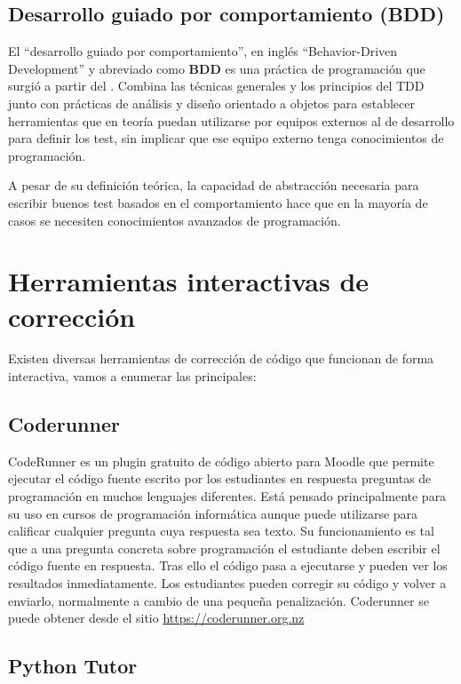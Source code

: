\subsection {Desarrollo guiado por comportamiento (BDD)}

El ``desarrollo guiado por comportamiento'', en inglés ``Behavior-Driven Development'' y abreviado como \textbf{BDD} es una práctica de programación que surgió a partir del . Combina las técnicas generales y los principios del TDD junto con prácticas de análisis y diseño orientado a objetos para establecer herramientas que en teoría puedan utilizarse por equipos externos al de desarrollo para definir los test, sin implicar que ese equipo externo tenga conocimientos de programación.

\bigskip
A pesar de su definición teórica, la capacidad de abstracción necesaria para escribir buenos test basados en el comportamiento hace que en la mayoría de casos se necesiten conocimientos avanzados de programación.

\section {Herramientas interactivas de corrección}

Existen diversas herramientas de corrección de código que funcionan de forma interactiva, vamos a enumerar las principales:

\subsection {Coderunner}

CodeRunner es un plugin gratuito de código abierto para Moodle que permite ejecutar el código fuente escrito por los estudiantes en respuesta preguntas de programación en muchos lenguajes diferentes. Está pensado principalmente para su uso en cursos de programación informática aunque puede utilizarse para calificar cualquier pregunta cuya respuesta sea texto. Su funcionamiento es tal que a una pregunta concreta sobre programación el estudiante deben escribir el código fuente en respuesta. Tras ello el código pasa a ejecutarse y pueden ver los resultados inmediatamente. Los estudiantes pueden corregir su código y volver a enviarlo, normalmente a cambio de una pequeña penalización. Coderunner se puede obtener desde el sitio \url{https://coderunner.org.nz}

\subsection {Python Tutor}

